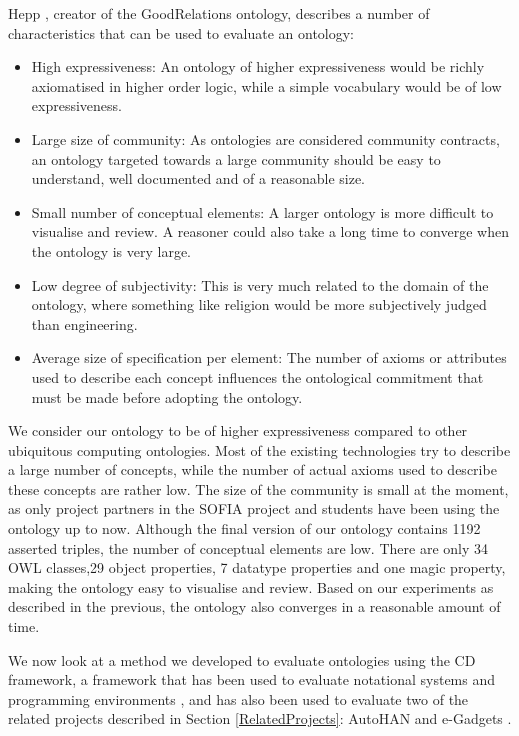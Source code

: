 Hepp \cite{Hepp2007}, creator of the GoodRelations ontology, describes a number of characteristics that can be used to evaluate an ontology:

\begin{itemize}
	\item High expressiveness: An ontology of higher expressiveness would be richly axiomatised in higher order logic, while a simple vocabulary would be of low expressiveness.
	\item Large size of community: As ontologies are considered community contracts,  an ontology targeted towards a large community should be easy to understand, well documented and of a reasonable size.
	\item Small number of conceptual elements: A larger ontology is more difficult to visualise and review. A reasoner could also take a long time to converge when the ontology is very large.
	\item Low degree of subjectivity: This is very much related to the domain of the ontology, where something like religion would be more subjectively judged than engineering.
	\item Average size of specification per element: The number of axioms or attributes used to describe each concept influences the ontological commitment\label{OntologicalCommitment} that must be made before adopting the ontology. %
\end{itemize}

We consider our ontology to be of higher expressiveness compared to other ubiquitous computing ontologies. Most of the existing technologies try to describe a large number of concepts, while the number of actual axioms used to describe these concepts are rather low. The size of the community is small at the moment, as only project partners in the \ac{SOFIA} project and students have been using the ontology up to now. Although the final version of our ontology contains 1192 asserted triples, the number of conceptual elements are low. There are only 34 \ac{OWL} classes,29 object properties, 7 datatype properties and one magic property, making the ontology easy to visualise and review. Based on our experiments as described in the previous, the ontology also converges in a reasonable amount of time.

We now look at a method we developed to evaluate ontologies using the \ac{CD} framework, a framework that has been used to evaluate notational systems and programming environments \cite{Green1996}, and has also been used to evaluate two of the related projects described in Section \ref{RelatedProjects}: AutoHAN \cite{Blackwell2001} and e-Gadgets \cite{Mavrommati2004}.

